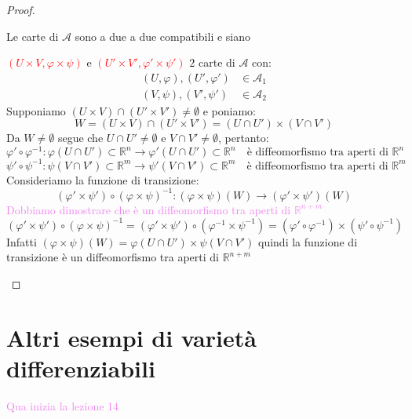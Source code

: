 \begin{proof}
\begin{itemize}
            Le carte di $\mathcal{A}$ sono a due a due compatibili e siano
            
            \textcolor{red}{$(U \times V, \varphi \times \psi)$} e \textcolor{red}{$(U' \times V', \varphi' \times \psi')$} $2$ carte di $\mathcal{A}$ con:
            \[
            \begin{aligned}
            (U, \varphi), (U', \varphi') &\in \mathcal{A}_1 \\
            (V, \psi), (V', \psi') &\in \mathcal{A}_2
            \end{aligned}
            \]
            Supponiamo $(U \times V) \cap (U' \times V') \neq \emptyset$ e poniamo:
            \[
            W = (U \times V) \cap (U' \times V') = (U \cap U') \times (V \cap V')
            \]
            Da $W \neq \emptyset$ segue che $U \cap U' \neq \emptyset$ e $V \cap V' \neq \emptyset$, pertanto:
            \[
            \varphi' \circ \varphi^{-1} \colon \varphi(U \cap U') \subset \mathbb{R}^n \longrightarrow \varphi'(U \cap U') \subset \mathbb{R}^n \quad \text{è diffeomorfismo tra aperti di } \mathbb{R}^n
            \]
            \[
            \psi' \circ \psi^{-1} \colon \psi(V \cap V') \subset \mathbb{R}^m \longrightarrow \psi'(V \cap V') \subset \mathbb{R}^m \quad \text{è diffeomorfismo tra aperti di } \mathbb{R}^m
            \]
            Consideriamo la funzione di transizione:
            \[
            (\varphi' \times \psi') \circ (\varphi \times \psi)^{-1} \colon (\varphi \times \psi)(W) \longrightarrow (\varphi' \times \psi')(W)
            \]
            \textcolor{violet}{Dobbiamo dimostrare che è un diffeomorfismo tra aperti di $\mathbb{R}^{n+m}$}
            \[
            (\varphi' \times \psi') \circ (\varphi \times \psi)^{-1} = \left( \varphi' \times \psi ' \right) \circ \left( \varphi^{-1} \times \psi^{-1} \right) = (\varphi' \circ \varphi^{-1}) \times (\psi' \circ \psi^{-1})
            \]
            Infatti $(\varphi \times \psi)(W) = \varphi(U \cap U') \times \psi(V \cap V')$ quindi la funzione di transizione 
            è un diffeomorfismo tra aperti di $\mathbb{R}^{n+m}$
        \end{itemize}
        \end{proof}
    \section{Altri esempi di varietà differenziabili}
        \textcolor{violet}{Qua inizia la lezione 14}

